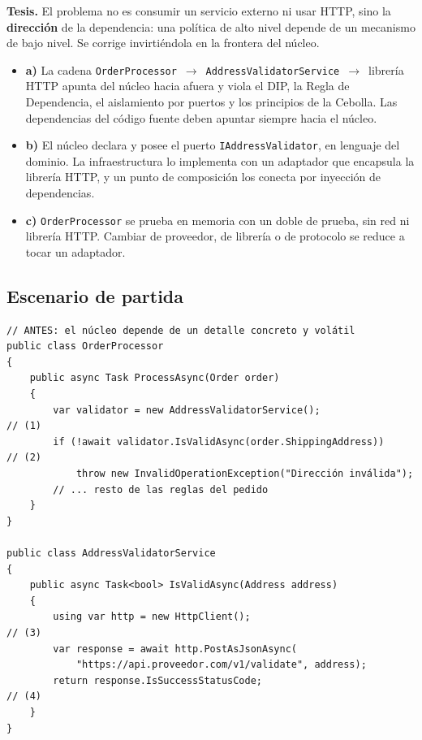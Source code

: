 \documentclass[11pt,a4paper]{article}
\begin{document}
\textbf{Tesis.} El problema no es consumir un servicio externo ni usar HTTP, sino la
\textbf{dirección} de la dependencia: una política de alto nivel depende de un mecanismo de
bajo nivel. Se corrige invirtiéndola en la frontera del núcleo.

\begin{itemize}[leftmargin=1.4em]
\item \textbf{a)} La cadena \texttt{OrderProcessor}~$\rightarrow$~\texttt{AddressValidatorService}~$\rightarrow$~librería
HTTP apunta del núcleo hacia afuera y viola el DIP, la Regla de Dependencia, el aislamiento por
puertos y los principios de la Cebolla. Las dependencias del código fuente deben apuntar
siempre hacia el núcleo.
\item \textbf{b)} El núcleo declara y posee el puerto \texttt{IAddressValidator}, en lenguaje
del dominio. La infraestructura lo implementa con un adaptador que encapsula la librería HTTP,
y un punto de composición los conecta por inyección de dependencias.
\item \textbf{c)} \texttt{OrderProcessor} se prueba en memoria con un doble de prueba, sin red
ni librería HTTP. Cambiar de proveedor, de librería o de protocolo se reduce a tocar un
adaptador.
\end{itemize}

\subsection*{Escenario de partida}

\begin{lstlisting}[language={[Sharp]C}]
// ANTES: el núcleo depende de un detalle concreto y volátil
public class OrderProcessor
{
    public async Task ProcessAsync(Order order)
    {
        var validator = new AddressValidatorService();               // (1)
        if (!await validator.IsValidAsync(order.ShippingAddress))    // (2)
            throw new InvalidOperationException("Dirección inválida");
        // ... resto de las reglas del pedido
    }
}

public class AddressValidatorService
{
    public async Task<bool> IsValidAsync(Address address)
    {
        using var http = new HttpClient();                           // (3)
        var response = await http.PostAsJsonAsync(
            "https://api.proveedor.com/v1/validate", address);
        return response.IsSuccessStatusCode;                         // (4)
    }
}
\end{lstlisting}
\end{document}
